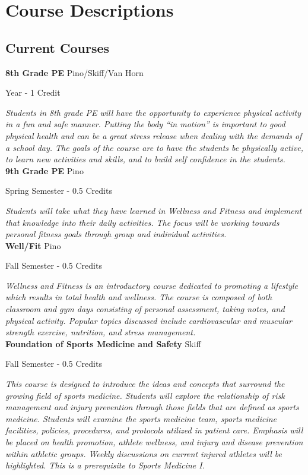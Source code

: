 \section{Course Descriptions}

\subsection{Current Courses}
\noindent\textbf{8th Grade PE} \hfill Pino/Skiff/Van Horn

\noindent Year - 1 Credit

\vspace{1mm}\emph{Students in 8th grade PE will have the opportunity to experience physical activity in a fun and safe manner.  Putting the body “in motion” is important to good physical health and can be a great stress release when dealing with the demands of a school day.  The goals of the course are to have the students be physically active, to learn new activities and skills, and to build self confidence in the students.}\\

\noindent\textbf{9th Grade PE} \hfill Pino

\noindent Spring Semester - 0.5 Credits

\vspace{1mm}\emph{Students will take what they have learned in Wellness and Fitness and implement that knowledge into their daily activities.  The focus will be working towards personal fitness goals through group and individual activities.}\\

\noindent\textbf{Well/Fit} \hfill Pino

\noindent Fall Semester - 0.5 Credits

\vspace{1mm}\emph{Wellness and Fitness is an introductory course dedicated to promoting a lifestyle which results in total health and wellness. The course is composed of both classroom and gym days consisting of personal assessment, taking notes, and physical activity.  Popular topics discussed include cardiovascular and muscular strength exercise, nutrition, and stress management.}\\

\noindent\textbf{Foundation of Sports Medicine and Safety} \hfill Skiff

\noindent Fall Semester - 0.5 Credits

\vspace{1mm}\emph{This course is designed to introduce the ideas and concepts that surround the growing field of sports medicine.  Students will explore the relationship of risk management and injury prevention through those fields that are defined as sports medicine. Students will examine the sports medicine team, sports medicine facilities, policies, procedures, and protocols utilized in patient care. Emphasis will be placed on health promotion, athlete wellness, and injury and disease prevention within athletic groups. Weekly discussions on current injured athletes will be highlighted.  This is a prerequisite to Sports Medicine I.}\\

